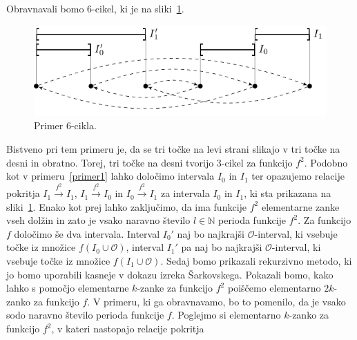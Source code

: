 \documentclass[mat2]{fmfdelo}
\newcommand{\N}{\mathbb N}
\begin{document}
\begin{primer}[6-cikel] \label{primer4}
Obravnavali bomo 6-cikel, ki je na sliki~\ref{fig:6cikel}. 
 \begin{figure}[h]
  \centering
  \includegraphics{images/sestcikel.pdf}
  \caption[Primer vektorske slike.]{Primer 6-cikla.}
  \label{fig:6cikel}
\end{figure}
Bistveno pri tem primeru je, da se tri točke na levi strani slikajo v tri točke na desni in obratno. Torej, tri točke na desni tvorijo 3-cikel
 za funkcijo $f^2$. Podobno kot v primeru~\ref{primer1} lahko določimo intervala $I_0$ in $I_1$ ter opazujemo relacije pokritja $I_1 \xrightarrow{f^2} I_1$, $I_1 \xrightarrow{f^2} I_0$ in $I_0 \xrightarrow{f^2} I_1$ za intervala $I_0$ in $I_1$, ki sta prikazana na sliki~\ref{fig:6cikel}. Enako kot prej lahko zaključimo, da ima funkcije $f^2$ elementarne zanke vseh dolžin in zato je vsako naravno število $l \in \N$ perioda funkcije $f^2$. Za funkcijo $f$ določimo še dva intervala. Interval $I_0'$ naj bo najkrajši $\mathcal{O}$-interval, ki vsebuje točke iz množice $f(I_0 \cup \mathcal{O})$, interval $I_1'$ pa naj bo najkrajši $\mathcal{O}$-interval, ki vsebuje točke iz množice $f(I_1 \cup \mathcal{O})$. Sedaj bomo prikazali rekurzivno metodo, ki jo bomo uporabili kasneje v dokazu izreka Šarkovskega. Pokazali bomo, kako lahko s pomočjo elementarne $k$-zanke za funkcijo $f^2$ poiščemo elementarno $2k$-zanko za funkcijo $f$. V primeru, ki ga obravnavamo, bo to pomenilo, da je vsako sodo naravno število perioda funkcije $f$.
Poglejmo si elementarno $k$-zanko za funkcijo $f^2$, v kateri nastopajo relacije pokritja 

\end{primer}
\end{document}
